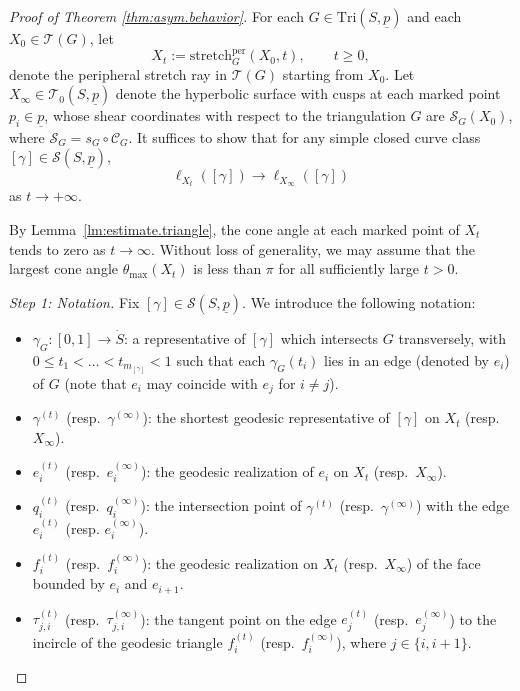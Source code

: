 \documentclass[11pt, letterpaper]{amsart}
\theoremstyle{definition}
\theoremstyle{remark}
\newcommand{\up}{\underline{p}}
\newcommand{\Sp}{(S,\up)}
\newcommand{\TSp}{\text{Tri}\Sp}
\newcommand{\cC}{\mathcal{C}}
\newcommand{\cT}{\mathcal{T}}
\newcommand{\cTG}{\mathcal{T} (G)}
\newcommand{\cS}{\mathcal{S}}
\numberwithin{equation}{section}
\begin{document}
\begin{proof}[Proof of Theorem \ref{thm:asym.behavior}]
For each \(G\in\TSp\) and each \(X_0\in\cTG\), let
\[
X_t:=\text{stretch}^{\mathrm{per}}_G(X_0,t),\qquad t\ge 0,
\]
denote the peripheral stretch ray in \(\cTG\) starting from \(X_0\). Let \(X_{\infty}\in\cT_0(S,\up)\) denote the hyperbolic surface with cusps at each marked point \(p_i\in \up\), whose shear coordinates with respect to the triangulation \(G\) are \(\cS_G(X_0)\), where \(\cS_G=s_G\circ\cC_G\). 
It suffices to show that for any simple closed curve class \([\gamma]\in\cS(S,\up)\),
\[
\ell_{X_t}([\gamma])\longrightarrow \ell_{X_{\infty}}([\gamma])
\]
as \(t\rightarrow +\infty\). 

By Lemma~\ref{lm:estimate.triangle}, the cone angle at each marked point of \(X_t\) tends to zero as \(t\to\infty\). Without loss of generality, we may assume that the largest cone angle \(\theta_{\max}(X_t)\) is less than \(\pi\) for all sufficiently large \(t>0\).

\medskip\noindent\emph{Step 1: Notation.}
Fix \([\gamma]\in\cS(S,\up)\). We introduce the following notation:
\begin{itemize}
\item \(\gamma_G : [0, 1] \to \dot{S}\): a representative of \([\gamma]\) which intersects \(G\) transversely, with \(0 \leq t_1 < \dots < t_{m_{[\gamma]}} < 1\) such that each \(\gamma_{G} (t_i)\) lies in an edge (denoted by $e_i$) of \(G\) (note that \(e_i\) may coincide with \(e_j\) for \(i\ne j\)).
\item \(\gamma^{(t)}\) (resp.\ \(\gamma^{(\infty)}\)): the shortest geodesic representative of \([\gamma]\) on \(X_t\) (resp.\ \(X_{\infty}\)).
\item \(e_i^{(t)}\) (resp.\ \(e_i^{(\infty)}\)): the geodesic realization of \(e_i\) on \(X_t\) (resp.\ \(X_{\infty}\)).
\item \(q_i^{(t)}\) (resp.\ \(q_i^{(\infty)}\)): the intersection point of  \(\gamma^{(t)}\) (resp.\ \(\gamma^{(\infty)}\)) with the edge $e_i^{(t)}$ (resp. $e_i^{(\infty)}$). \item \(f_i^{(t)}\) (resp.\ \(f_i^{(\infty)}\)): the geodesic realization on \(X_t\) (resp.\ \(X_{\infty}\)) of the face bounded by \(e_i\) and \(e_{i+1}\).
\item \(\tau_{j,i}^{(t)}\)  (resp.\ \(\tau_{j,i}^{(\infty)}\)): the tangent point on the edge \(e_j^{(t)}\) (resp.\ \(e_j^{(\infty)}\)) to the incircle of the geodesic triangle \(f^{(t)}_i\) (resp.\ \(f^{(\infty)}_i\)), where \(j\in\{i,i+1\}\). 
\end{itemize}


\end{proof}
\end{document}
